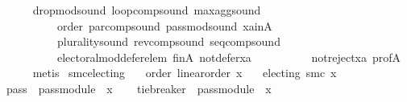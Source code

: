 \begin{isabellebody}
\ \ \ \ \isamarkupfalse%
\ drop{\isacharunderscore}{\kern0pt}mod{\isacharunderscore}{\kern0pt}sound\ loop{\isacharunderscore}{\kern0pt}comp{\isacharunderscore}{\kern0pt}sound\ max{\isacharunderscore}{\kern0pt}agg{\isacharunderscore}{\kern0pt}sound\isanewline
\ \ \ \ \ \ \ \ \ \ order\ par{\isacharunderscore}{\kern0pt}comp{\isacharunderscore}{\kern0pt}sound\ pass{\isacharunderscore}{\kern0pt}mod{\isacharunderscore}{\kern0pt}sound\ xa{\isacharunderscore}{\kern0pt}in{\isacharunderscore}{\kern0pt}A\isanewline
\ \ \ \ \ \ \ \ \ \ plurality{\isacharunderscore}{\kern0pt}sound\ rev{\isacharunderscore}{\kern0pt}comp{\isacharunderscore}{\kern0pt}sound\ seq{\isacharunderscore}{\kern0pt}comp{\isacharunderscore}{\kern0pt}sound\isanewline
\ \ \ \ \ \ \ \ \ \ electoral{\isacharunderscore}{\kern0pt}mod{\isacharunderscore}{\kern0pt}defer{\isacharunderscore}{\kern0pt}elem\ fin{\isacharunderscore}{\kern0pt}A\ not{\isacharunderscore}{\kern0pt}defer{\isacharunderscore}{\kern0pt}xa\isanewline
\ \ \ \ \ \ \ \ \ \ not{\isacharunderscore}{\kern0pt}reject{\isacharunderscore}{\kern0pt}xa\ prof{\isacharunderscore}{\kern0pt}A\isanewline
\ \ \ \ \isamarkupfalse%
\ metis\isanewline
{}\isamarkupfalse%
%
\endisatagproof
{\isafoldproof}%
%
\isadelimproof
%
\endisadelimproof
%
\isadelimdocument
%
\endisadelimdocument
%
\isatagdocument
%
\isamarkuptrue%
%
\endisatagdocument
{\isafolddocument}%
%
\isadelimdocument
%
\endisadelimdocument
{}\isamarkupfalse%
\ smc{\isacharunderscore}{\kern0pt}electing{\isacharcolon}{\kern0pt}\isanewline
\ \ \ order{\isacharcolon}{\kern0pt}\ {\isachardoublequoteopen}linear{\isacharunderscore}{\kern0pt}order\ x{\isachardoublequoteclose}\isanewline
\ \ \ {\isachardoublequoteopen}electing\ {\isacharparenleft}{\kern0pt}smc\ x{\isacharparenright}{\kern0pt}{\isachardoublequoteclose}\isanewline
%
\isadelimproof
%
\endisadelimproof
%
\isatagproof
{}\isamarkupfalse%
\ {\isacharminus}{\kern0pt}\isanewline
\ \ \isamarkupfalse%
\ {\isacharquery}{\kern0pt}pass{}\ {\isacharequal}{\kern0pt}\ {\isachardoublequoteopen}pass{\isacharunderscore}{\kern0pt}module\ {}\ x{\isachardoublequoteclose}\isanewline
\ \ \isamarkupfalse%
\ {\isacharquery}{\kern0pt}tie{\isacharunderscore}{\kern0pt}breaker\ {\isacharequal}{\kern0pt}\ {\isachardoublequoteopen}{\isacharparenleft}{\kern0pt}pass{\isacharunderscore}{\kern0pt}module\ {}\ x{\isacharparenright}{\kern0pt}{\isachardoublequoteclose}\isanewline

\end{isabellebody}
